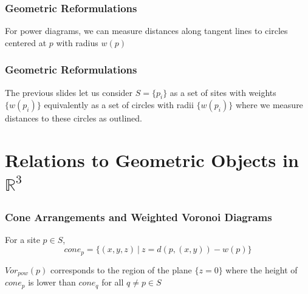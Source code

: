 \documentclass{beamer}
\newcommand{\R}{\mathbb{R}}
\begin{document}
\begin{frame}
  \frametitle{Geometric Reformulations}

  \begin{figure}
  \end{figure}

  For power diagrams, we can measure distances along tangent lines to circles centered at $p$ with radius $w(p)$

\end{frame}

\begin{frame}
  \frametitle{Geometric Reformulations}

  The previous slides let us consider $S = \{ p_i \}$ as a set of sites with weights $\{ w(p_i) \}$ equivalently as a set of circles with radii $\{
  w(p_i) \}$ where we measure distances to these circles as outlined.

\end{frame}

\section{Relations to Geometric Objects in $\R^3$}
\begin{frame}
  \frametitle{Cone Arrangements and Weighted Voronoi Diagrams}

  For a site $p \in S$,
  \[ cone_p = \{ (x,y,z) \ | \ z = d(p, (x,y)) - w(p) \} \]

  \vspace{1cm}

  $Vor_{pow}(p)$ corresponds to the region of the plane $\{ z = 0 \}$ where the height of $cone_p$ is lower than $cone_q$ for all $q \neq p \in S$
  \cite{rosenberger_additive}

\end{frame}
\end{document}

